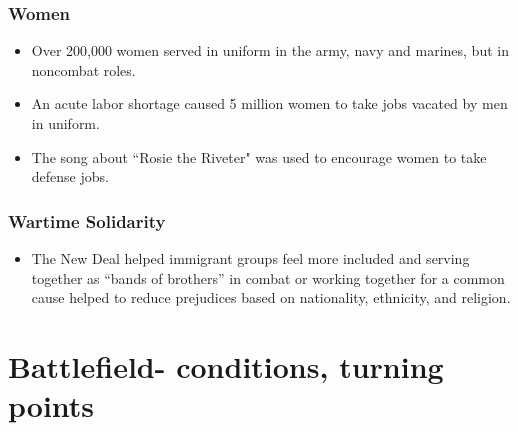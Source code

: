 \documentclass[12pt]{article} %
\begin{document}
	\subsubsection{Women}
	\begin{itemize}
		\item Over 200,000 women served in uniform in the army, navy and marines, but in noncombat roles.
		\item An acute labor shortage caused 5 million women to take jobs vacated by men in uniform.
		\item The song about ``Rosie the Riveter" was used to encourage women to take defense jobs.
	\end{itemize}

	\subsubsection{Wartime Solidarity}
	\begin{itemize}
		\item The New Deal helped immigrant groups feel more included and serving together as ``bands of brothers'' in
			combat or working together for a common cause helped to reduce prejudices based on nationality, ethnicity,
			and religion.
	\end{itemize}

	\section{Battlefield- conditions, turning points}


	\newpage
\end{document}
